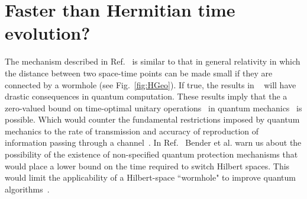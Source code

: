 \documentclass[12pt, a4paper]{report}
\begin{document}
\section{Faster than Hermitian time evolution?}\label{faster}
The mechanism described in Ref.~\cite{Bender_2007} is similar to that in general relativity in which the distance between two space-time points can be made small if they are connected by a wormhole (see Fig.~\ref{fig:HGeo}). If true, the results in ~\cite{Bender_2007} will have drastic consequences in quantum computation. These results imply that the a zero-valued bound on time-optimal unitary operations~\cite{OptimalControl} in quantum mechanics~\cite{Brachistochrone_Mostafazadeh} is possible. Which would counter the fundamental restrictions imposed by quantum mechanics to the rate of transmission and accuracy of reproduction of information passing through a channel~\cite{StatStructure}. In Ref.~\cite{Bender_2007} Bender et al. warn us about the possibility of the existence of non-specified quantum protection mechanisms that would place a lower bound on the time required to switch Hilbert spaces. This would limit the applicability of a Hilbert-space ``wormhole" to improve quantum algorithms~\cite{Bender_2007}. 
\end{document}
